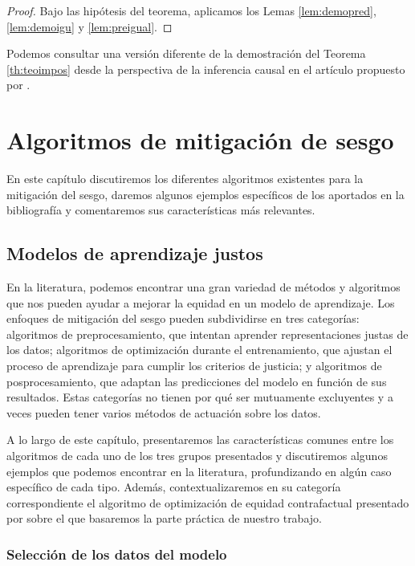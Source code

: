 \documentclass[oneside,openright,titlepage,numbers=noenddot,openany,headinclude,footinclude=true,
cleardoublepage=empty,abstractoff,BCOR=5mm,paper=a4,fontsize=12pt,main=spanish]{scrreprt}
\begin{document}
\begin{proof}
Bajo las hipótesis del teorema, aplicamos los Lemas \ref{lem:demopred}, \ref{lem:demoigu} y \ref{lem:preigual}.
\end{proof}

Podemos consultar una versión diferente de la demostración del Teorema \ref{th:teoimpos} desde la perspectiva de la inferencia causal en el artículo propuesto por \cite{impossibilityth2021}.

\chapter{Algoritmos de mitigación de sesgo}

En este capítulo discutiremos los diferentes algoritmos existentes para la mitigación del sesgo, daremos algunos ejemplos específicos de los aportados en la bibliografía y comentaremos sus características más relevantes.

\section{Modelos de aprendizaje justos}

En la literatura, podemos encontrar una gran variedad de métodos y algoritmos que nos pueden ayudar a mejorar la equidad en un modelo de aprendizaje. Los enfoques de mitigación del sesgo pueden subdividirse en tres categorías: algoritmos de preprocesamiento, que intentan aprender representaciones justas de los datos; algoritmos de optimización durante el entrenamiento, que ajustan el proceso de aprendizaje para cumplir los criterios de justicia; y algoritmos de posprocesamiento, que adaptan las predicciones del modelo en función de sus resultados. Estas categorías no tienen por qué ser mutuamente excluyentes y a veces pueden tener varios métodos de actuación sobre los datos.

A lo largo de este capítulo, presentaremos las características comunes entre los algoritmos de cada uno de los tres grupos presentados y discutiremos algunos ejemplos que podemos encontrar en la literatura, profundizando en algún caso específico de cada tipo. Además, contextualizaremos en su categoría correspondiente el algoritmo de optimización de equidad contrafactual presentado por \cite{counterfactual2018} sobre el que basaremos la parte práctica de nuestro trabajo.

\subsection{Selección de los datos del modelo}
\end{document}
